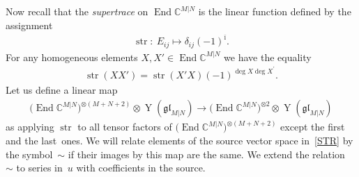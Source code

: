 \documentclass[10pt,a4paper]{amsart}
\numberwithin{equation}{section}
\def\bi{{\bar\imath }}
\def\CC{{\mathbb{C}}}
\def\CMN{\CC^{M|N}}
\def\de{\delta}
\def\End{\operatorname{End}}
\def\glMN{\mathfrak{gl}_{M|N}}
\def\ot{\otimes}
\def\str{\operatorname{str}}
\def\YMN{\operatorname{Y}(\glMN)}
\begin{document}
Now recall that the \emph{supertrace} on $\End\CMN$ is the linear function
defined by the assignment
\begin{gather*}
\str\colon \ E_{ij}\mapsto\de_{ij} (-1)^{\bi} .
\end{gather*}
For any homogeneous elements $X,X'\in\End\CMN$ we have the equality
\begin{gather*}
\str (X X' )=
\str (X'X ) (-1)^{\deg X\deg X^\prime}.
\end{gather*}
Let us define a linear map
\begin{gather}\label{STR}
\big(\End\CMN\big)^{\ot (M+N+2)}\ot\YMN\to\big(\End\CMN\big)^{\ot 2}\ot\YMN
\end{gather}
as applying $\str$ to all tensor factors of
$\big(\End\CMN\big)^{\ot (M+N+2)}$ except the first and the last~ones.
We will relate elements of the source vector space in~\eqref{STR}
by the symbol~$\sim$ if
their images by this map are the same.
We extend the relation~$\sim$ to series in~$u$ with coefficients in the source.
\end{document}
